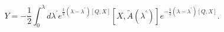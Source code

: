 \begin{equation}
Y=-\frac{1}{2}\int_{0}^{\lambda}d\lambda^{\prime}e^{\frac{1}{2}(\lambda
-\lambda^{\prime})[Q,X]}[X,\tilde{A}(\lambda^{\prime})]e^{-\frac{1}{2}%
(\lambda-\lambda^{\prime})[Q,X]}.\label{1.16}%
\end{equation}

